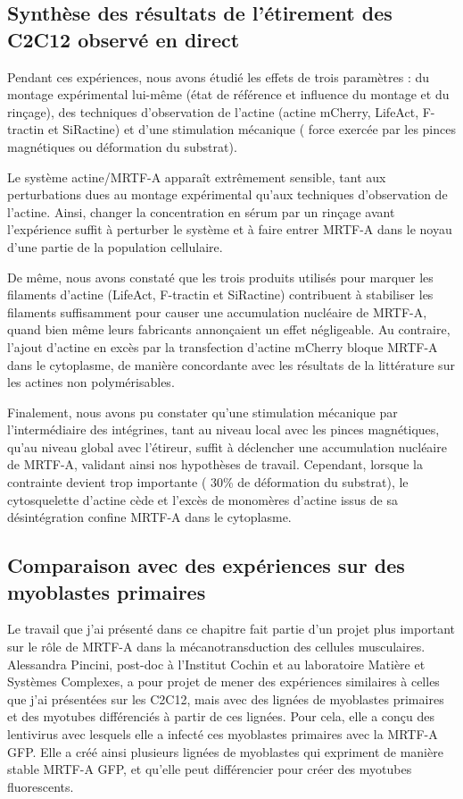 \subsection{Synthèse des résultats de l'étirement des C2C12 observé en direct}

Pendant ces expériences, nous avons étudié les effets de trois paramètres : du montage expérimental lui-même (état de référence et influence du montage et du rinçage), des techniques d'observation de l'actine (actine mCherry, LifeAct, F-tractin et SiRactine) et d'une stimulation mécanique ( force exercée par les pinces magnétiques ou déformation du substrat). 

Le système actine/MRTF-A apparaît extrêmement sensible, tant aux perturbations dues au montage expérimental qu'aux techniques d'observation de l'actine. 
Ainsi, changer la concentration en sérum par un rinçage avant l'expérience suffit à perturber le système et à faire entrer MRTF-A dans le noyau d'une partie de la population cellulaire. 

De même, nous avons constaté que les trois produits utilisés pour marquer les filaments d'actine (LifeAct, F-tractin et SiRactine) contribuent à stabiliser les filaments suffisamment pour causer une accumulation nucléaire de MRTF-A, quand bien même leurs fabricants annonçaient un effet négligeable. 
Au contraire, l'ajout d'actine en excès par la transfection d'actine mCherry bloque MRTF-A dans le cytoplasme, de manière concordante avec les résultats de la littérature sur les actines non polymérisables. 

Finalement, nous avons pu constater qu'une stimulation mécanique par l'intermédiaire des intégrines, tant au niveau local avec les pinces magnétiques, qu'au niveau global avec l'étireur, suffit à déclencher une accumulation nucléaire de MRTF-A, validant ainsi nos hypothèses de travail. Cependant, lorsque la contrainte devient trop importante ( 30\% de déformation du substrat), le cytosquelette d'actine cède et l'excès de monomères d'actine issus de sa désintégration confine MRTF-A dans le cytoplasme. 







\subsection{Comparaison avec des expériences sur des myoblastes primaires}

Le travail que j'ai présenté dans ce chapitre fait partie d'un projet plus important sur le rôle de MRTF-A dans la mécanotransduction des cellules musculaires. Alessandra Pincini, post-doc à l'Institut Cochin et au laboratoire Matière et Systèmes Complexes, a pour projet de mener des expériences similaires à celles que j'ai présentées sur les C2C12, mais avec des lignées de myoblastes primaires et des myotubes différenciés à partir de ces lignées. Pour cela, elle a conçu des lentivirus avec lesquels elle a infecté ces myoblastes primaires avec la MRTF-A GFP. Elle a créé ainsi plusieurs lignées de myoblastes qui expriment de manière stable MRTF-A GFP, et qu'elle peut différencier pour créer des myotubes fluorescents. 

